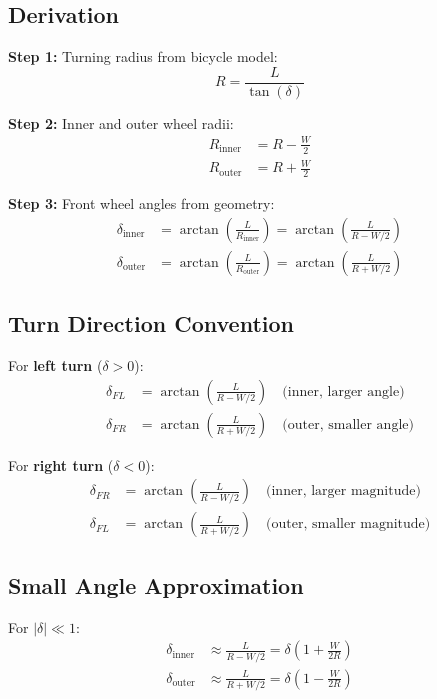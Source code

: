 \documentclass[11pt,a4paper]{article}
\begin{document}
\subsection{Derivation}

\textbf{Step 1:} Turning radius from bicycle model:
\begin{equation}
R = \frac{L}{\tan(\delta)}
\end{equation}

\textbf{Step 2:} Inner and outer wheel radii:
\begin{align}
R_{\text{inner}} &= R - \frac{W}{2} \\
R_{\text{outer}} &= R + \frac{W}{2}
\end{align}

\textbf{Step 3:} Front wheel angles from geometry:
\begin{align}
\delta_{\text{inner}} &= \arctan\left(\frac{L}{R_{\text{inner}}}\right) = \arctan\left(\frac{L}{R - W/2}\right) \\
\delta_{\text{outer}} &= \arctan\left(\frac{L}{R_{\text{outer}}}\right) = \arctan\left(\frac{L}{R + W/2}\right)
\end{align}

\subsection{Turn Direction Convention}

For \textbf{left turn} ($\delta > 0$):
\begin{align}
\delta_{FL} &= \arctan\left(\frac{L}{R - W/2}\right) \quad \text{(inner, larger angle)} \\
\delta_{FR} &= \arctan\left(\frac{L}{R + W/2}\right) \quad \text{(outer, smaller angle)}
\end{align}

For \textbf{right turn} ($\delta < 0$):
\begin{align}
\delta_{FR} &= \arctan\left(\frac{L}{R - W/2}\right) \quad \text{(inner, larger magnitude)} \\
\delta_{FL} &= \arctan\left(\frac{L}{R + W/2}\right) \quad \text{(outer, smaller magnitude)}
\end{align}

\subsection{Small Angle Approximation}

For $|\delta| \ll 1$:
\begin{align}
\delta_{\text{inner}} &\approx \frac{L}{R - W/2} = \delta \left(1 + \frac{W}{2R}\right) \\
\delta_{\text{outer}} &\approx \frac{L}{R + W/2} = \delta \left(1 - \frac{W}{2R}\right)
\end{align}
\end{document}
